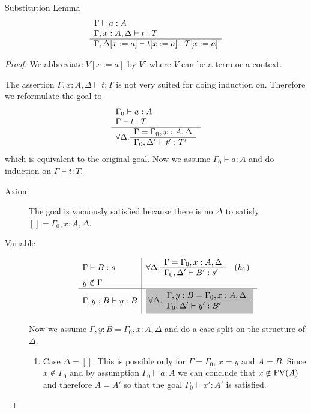 \begin{theorem} Substitution Lemma
  \label{substitutionlemma}
  $$
  \begin{array}{l}  \Gamma \vdash a:A
    \\
    \Gamma,x:A,\Delta \vdash t:T
   \\ \hline \Gamma,\Delta[x:=a] \vdash t[x:=a] : T[x:=a]\end{array}
  $$
  \begin{proof}
    We abbreviate $V[x:=a]$ by $V'$ where $V$ can be a term or a context.

    The assertion $\Gamma,x:A,\Delta \vdash t:T$ is not very suited for doing
    induction on. Therefore we reformulate the goal to
    $$
    \begin{array}{l} 
      \Gamma_0\vdash a:A
      \\
      \Gamma \vdash t : T
     \\ \hline \forall \Delta .
      \begin{array}{l} \Gamma = \Gamma_0,x:A,\Delta \\ \hline \Gamma_0,\Delta' \vdash t' : T'\end{array}
    \end{array}
    $$
    which is equivalent to the original goal. Now we assume
    $\Gamma_0\vdash a:A$ and do induction on $\Gamma \vdash t : T$.

    \begin{description}

    \item[Axiom] The goal is vacuously satisfied because there is no $\Delta$
      to satisfy $[] = \Gamma_0,x:A,\Delta$.

    \item[Variable]
      $$
      \begin{array}{l|l}
        \Gamma \vdash B:s
        & \forall \Delta .
          \rulev
          {\Gamma = \Gamma_0,x:A,\Delta}
          {\Gamma_0,\Delta' \vdash B' : s'} \quad(h_1)
        \\
        y \notin \Gamma
        \\
        \hline
        \Gamma,y:B \vdash y:B
        & \goalbg{
          \forall \Delta .
          \rulev
          {\Gamma,y:B = \Gamma_0,x:A,\Delta}
          {\Gamma_0,\Delta' \vdash y': B'}
          }
      \end{array}
      $$

      Now we assume $\Gamma,y:B = \Gamma_0,x:A,\Delta$ and do a case split on
      the structure of $\Delta$.
      \begin{enumerate}

      \item Case $\Delta = []$. This is possible only for $\Gamma = \Gamma_0$,
        $x=y$ and $A = B$. Since $x \notin \Gamma_0$ and by assumption
        $\Gamma_0 \vdash a:A$ we can conclude that $x \notin \text{FV}(A)$ and
        therefore $A = A'$ so that the goal $\Gamma_0 \vdash x': A'$ is
        satisfied.


\end{enumerate}
\end{description}
\end{proof}
\end{theorem}
